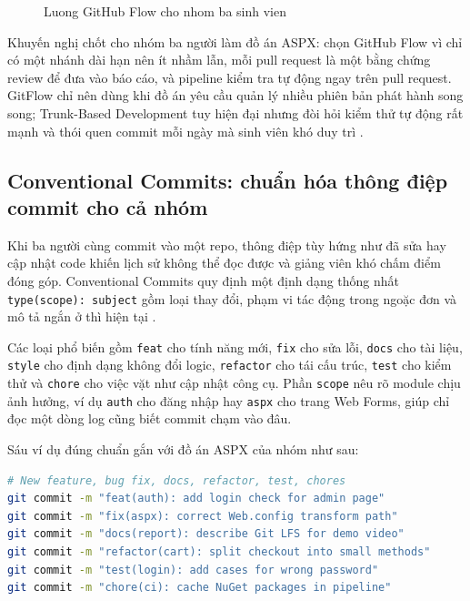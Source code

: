 \begin{figure}[H]
\centering
{}
\caption{Luong GitHub Flow cho nhom ba sinh vien}
\label{fig:c33-githubflow}
\end{figure}

Khuyến nghị chốt cho nhóm ba người làm đồ án ASPX: chọn GitHub Flow vì chỉ có một nhánh dài hạn nên ít nhầm lẫn, mỗi pull request là một bằng chứng review để đưa vào báo cáo, và pipeline kiểm tra tự động ngay trên pull request. GitFlow chỉ nên dùng khi đồ án yêu cầu quản lý nhiều phiên bản phát hành song song; Trunk-Based Development tuy hiện đại nhưng đòi hỏi kiểm thử tự động rất mạnh và thói quen commit mỗi ngày mà sinh viên khó duy trì \cite{gitflow,atlassiangit}.

\subsection{Conventional Commits: chuẩn hóa thông điệp commit cho cả nhóm}

Khi ba người cùng commit vào một repo, thông điệp tùy hứng như đã sửa hay cập nhật code khiến lịch sử không thể đọc được và giảng viên khó chấm điểm đóng góp. Conventional Commits quy định một định dạng thống nhất \verb|type(scope): subject| gồm loại thay đổi, phạm vi tác động trong ngoặc đơn và mô tả ngắn ở thì hiện tại \cite{convcommits}.

Các loại phổ biến gồm \verb|feat| cho tính năng mới, \verb|fix| cho sửa lỗi, \verb|docs| cho tài liệu, \verb|style| cho định dạng không đổi logic, \verb|refactor| cho tái cấu trúc, \verb|test| cho kiểm thử và \verb|chore| cho việc vặt như cập nhật công cụ. Phần \verb|scope| nêu rõ module chịu ảnh hưởng, ví dụ \verb|auth| cho đăng nhập hay \verb|aspx| cho trang Web Forms, giúp chỉ đọc một dòng log cũng biết commit chạm vào đâu.

Sáu ví dụ đúng chuẩn gắn với đồ án ASPX của nhóm như sau:

\begin{lstlisting}[language=bash, caption={Sau thong diep commit dung chuan}, label={lst:c33-convcommits}]
# New feature, bug fix, docs, refactor, test, chores
git commit -m "feat(auth): add login check for admin page"
git commit -m "fix(aspx): correct Web.config transform path"
git commit -m "docs(report): describe Git LFS for demo video"
git commit -m "refactor(cart): split checkout into small methods"
git commit -m "test(login): add cases for wrong password"
git commit -m "chore(ci): cache NuGet packages in pipeline"
\end{lstlisting}

